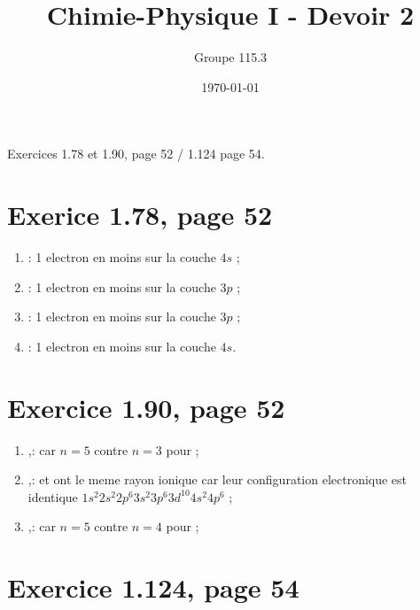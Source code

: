 \documentclass{article}
\title{Chimie-Physique I - Devoir 2}
\author{Groupe 115.3}
\date{\today}
\begin{document}
\maketitle

Exercices 1.78 et 1.90, page 52 / 1.124 page 54.

\section{Exerice 1.78, page 52}

\begin{enumerate}
  \item {} : 1 electron en moins sur la couche $4s$ ;
  \item {}: 1 electron en moins sur la couche $3p$ ;
  \item {}: 1 electron en moins sur la couche $3p$ ;
  \item {}: 1 electron en moins sur la couche $4s$.
\end{enumerate}

\section{Exercice 1.90, page 52}

\begin{enumerate}
	\item {},:  car $n = 5$ contre $n = 3$ pour  ;
	\item {},:  et  ont le meme rayon ionique 
	car leur configuration electronique est identique $1s^2 2s^2 2p^6 3s^2 3p^6 3d^{10}4s^2 4p^6$ ;
	\item {},:  car $n = 5$ contre $n = 4$ pour  ;
\end{enumerate}

\section{Exercice 1.124, page 54}

\end{document}
